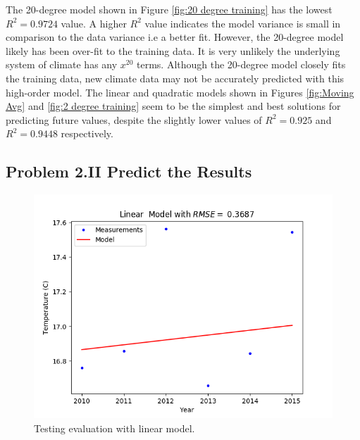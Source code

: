 \documentclass[letterpaper]{article}
\begin{document}
	The 20-degree model shown in Figure \ref{fig:20 degree training} has the lowest $R^2 = 0.9724$ value.
	A higher $R^2$ value indicates the model variance is small in comparison to the data variance i.e a better fit.
	However, the 20-degree model likely has been over-fit to the training data.
	It is very unlikely the underlying system of climate has any $x^{20}$ terms.
	Although the 20-degree model closely fits the training data, new climate data may not be accurately predicted with this high-order model.
	The linear and quadratic models shown in Figures \ref{fig:Moving Avg} and \ref{fig:2 degree training} seem to be the simplest and best solutions for predicting future values, despite the slightly lower values of $R^2 = 0.925$ and $R^2 = 0.9448$ respectively.

	\subsection*{Problem 2.II Predict the Results}
	\begin{figure}[h]
		\includegraphics[scale=0.625]{Figure_7_D2II_linear}
		\centering
		\caption{Testing evaluation with linear model.}
		\label{fig:Linear testing}
	\end{figure}
\end{document}
